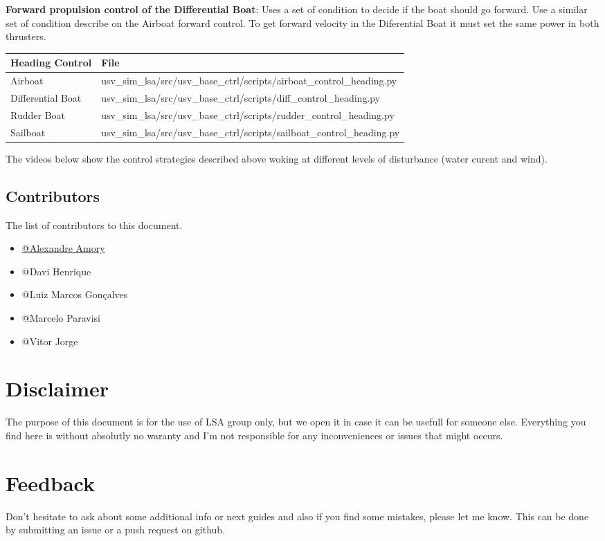 \documentclass[letterpaper,10pt,english]{sphinxmanual}
\begin{document}
\textbf{Forward propulsion control of the Differential Boat}: Uses a set of condition to decide if the boat should go forward. Use a similar set of condition describe on the Airboat forward control. To get forward velocity in the Diferential Boat it must set the same power in both thrusters.

\begin{tabulary}{\linewidth}{|L|L|}
\hline
\textsf{\relax 
Heading Control
} & \textsf{\relax 
File
}\\
\hline
Airboat
 & 
usv\_sim\_lsa/src/usv\_base\_ctrl/scripts/airboat\_control\_heading.py
\\
\hline
Differential Boat
 & 
usv\_sim\_lsa/src/usv\_base\_ctrl/scripts/diff\_control\_heading.py
\\
\hline
Rudder Boat
 & 
usv\_sim\_lsa/src/usv\_base\_ctrl/scripts/rudder\_control\_heading.py
\\
\hline
Sailboat
 & 
usv\_sim\_lsa/src/usv\_base\_ctrl/scripts/sailboat\_control\_heading.py
\\
\hline\end{tabulary}


The videos below show the control strategies described above woking at different levels of disturbance (water curent and wind).


\section{Contributors}
\label{source/contributors/index::doc}\label{source/contributors/index:contributors}
The list of contributors to this document.
\begin{itemize}
\item {} 
\href{https://amamory.github.io/}{@Alexandre Amory}

\item {} 
@Davi Henrique

\item {} 
@Luiz Marcos Gonçalves

\item {} 
@Marcelo Paravisi

\item {} 
@Vitor Jorge

\end{itemize}


\chapter{Disclaimer}
\label{index:disclaimer}
The purpose of this document is for the use of LSA group only, but we open it in case it can be usefull for someone else.
Everything you find here is without absolutly no waranty and I'm not responsible for any inconveniences or issues that might occurs.


\chapter{Feedback}
\label{index:feedback}
Don't hesitate to ask about some additional info or next guides and also if you find some mistakes, please let me know.
This can be done by submitting an issue or a push request on github.



\renewcommand{\indexname}{Index}
\printindex
\end{document}

